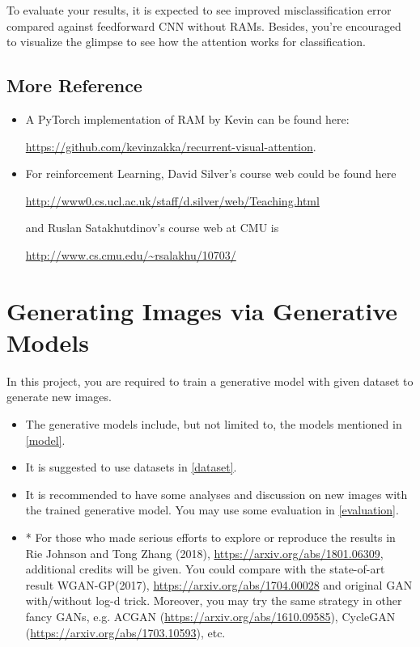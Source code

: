 \documentclass[11pt]{article}
\begin{document}
To evaluate your results, it is expected to see improved misclassification error compared against feedforward CNN without RAMs. Besides, you're encouraged to visualize the glimpse to see how the attention works for classification.

\subsection{More Reference}
\begin{itemize}
\item A PyTorch implementation of RAM by Kevin can be found here: 

\url{https://github.com/kevinzakka/recurrent-visual-attention}.
\item For reinforcement Learning, David Silver's course web could be found here 

\url{http://www0.cs.ucl.ac.uk/staff/d.silver/web/Teaching.html}

\noindent and Ruslan Satakhutdinov's course web at CMU is 

\url{http://www.cs.cmu.edu/~rsalakhu/10703/}
\end{itemize}


\section{Generating Images via Generative Models}

In this project, you are required to train a generative model with given dataset to generate new images.

\begin{itemize}
	\item The generative models include, but not limited to, the models mentioned in \ref{model}.
	\item It is suggested to use datasets in \ref{dataset}.
	\item It is recommended to have some analyses and discussion on new images with the trained generative model. You may use some evaluation in \ref{evaluation}.
	\item * For those who made serious efforts to explore or reproduce the results in Rie Johnson and Tong Zhang (2018), \url{https://arxiv.org/abs/1801.06309}, additional credits will be given.  You could compare with the state-of-art result WGAN-GP(2017), \url{https://arxiv.org/abs/1704.00028} and original GAN with/without log-d trick. Moreover, you may try the same strategy in other fancy GANs, e.g. ACGAN (\url{https://arxiv.org/abs/1610.09585}), CycleGAN (\url{https://arxiv.org/abs/1703.10593}), etc.
\end{itemize}
\end{document}
